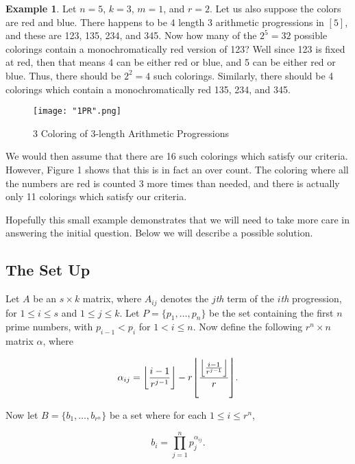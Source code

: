 \documentclass{article}
\DeclarePairedDelimiter\floor{\lfloor}{\rfloor}
\theoremstyle{definition}
\theoremstyle{remark}
\theoremstyle{definition}
\newtheorem{example}{Example}[section]
\begin{document}
\begin{example}
    Let $n=5$, $k=3$, $m=1$, and $r=2$. Let us also suppose the colors are red and blue. There happens to be 4 length 3 arithmetic progressions in $[5]$, and these are 123, 135, 234, and 345. Now how many of the $2^5=32$ possible colorings contain a monochromatically red version of 123? Well since 123 is fixed at red, then that means 4 can be either red or blue, and 5 can be either red or blue. Thus, there should be $2^2=4$ such colorings. Similarly, there should be 4 colorings which contain a monochromatically red 135, 234, and 345.
    
    \begin{figure}
        
        \texttt{[image: "1PR".png]}
        \caption{3 Coloring of 3-length Arithmetic Progressions}
        \label{fig:my_label}
    \end{figure}
    
    We would then assume that there are 16 such colorings which satisfy our criteria. However, Figure 1 shows that this is in fact an over count. The coloring where all the numbers are red is counted 3 more times than needed, and there is actually only 11 colorings which satisfy our criteria.\par 
    Hopefully this small example demonstrates that we will need to take more care in answering the initial question. Below we will describe a possible solution.
\end{example}

\subsection{The Set Up}
Let $A$ be an $s\times k$ matrix, where $A_{ij}$ denotes the $j$\textit{th} term of the $i$\textit{th} progression, for $1\leq i\leq s$ and $1\leq j\leq k$. Let $P=\{p_1,\dots,p_n\}$ be the set containing the first $n$ prime numbers, with $p_{i-1}<p_i$ for $1<i\leq n$. Now define the following $r^n\times n$ matrix $\alpha$, where

\begin{equation*}
    \alpha_{ij} = \floor*{\frac{i-1}{r^{j-1}}}-r\floor*{\frac{\floor*{\frac{i-1}{r^{j-1}}}}{r}}.
\end{equation*}

\noindent Now let $B=\{b_1, \dots, b_{r^n}\}$ be a set where for each $1\leq i\leq r^n$, 

\begin{equation*}
    b_i=\prod\limits_{j=1}^{n}p_j^{\alpha_{ij}}.
\end{equation*}
\end{document}
